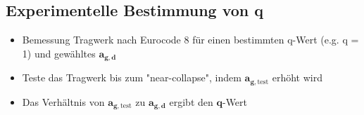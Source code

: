 \documentclass[fleqn,twoside]{article}
\begin{document}
    \subsection{Experimentelle Bestimmung von q}
            \begin{itemize}
                \item Bemessung Tragwerk nach Eurocode 8 für einen bestimmten q-Wert (e.g. q = 1) und gewähltes $\mathbf{a}_{\mathbf{g}, \mathbf{d}}$
                \item Teste das Tragwerk bis zum "near-collapse", indem $\mathbf{a}_{\mathbf{g}, \text {test}}$ erhöht wird
                \item Das Verhältnis von $\mathbf{a}_{\mathbf{g}, \text {test}}$ zu $\mathbf{a}_{\mathbf{g}, \mathbf{d}}$ ergibt den $\mathbf{q}$-Wert
            \end{itemize}



 
 
 
 
\end{document}
